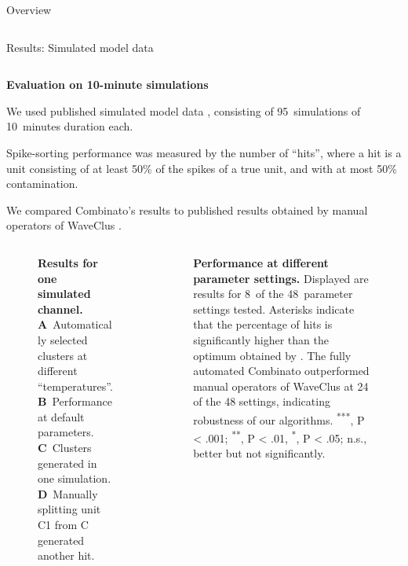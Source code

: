 \documentclass{beamer}
\renewcommand{\emph}{\textbf}
\newenvironment{wideitemize}{\itemize\addtolength{\itemsep}{.2em}\addtolength{\labelsep}{.1ex}}{\enditemize}
\begin{document}
\begin{frame}[t]
\begin{columns}[T]
\begin{column}{.49\linewidth}
\begin{block}{Overview}
\begin{columns}[T]
\begin{column}{.57\linewidth}
\end{column}
\end{columns}
\end{block}


  \begin{block}{Results: Simulated model data}

\begin{columns}[T]
\begin{column}{.95\linewidth}
\emph{Evaluation on 10-minute simulations}
        \begin{wideitemize}
    \item We used published simulated model data \parencite{pedreira_how_2012}, consisting of 95~simulations of 10~minutes duration each.
    \item Spike-sorting performance was measured by the number of ``hits'', where a hit is a unit consisting of at least 50\% of the spikes of a true unit, and with at most 50\% contamination.
    \item We compared Combinato's results to published results \parencite{pedreira_how_2012} obtained by manual operators of WaveClus \parencite{quian_quiroga_unsupervised_2004}.
    \end{wideitemize}

  
\begin{columns}[T]
  \begin{column}{.47\linewidth}

    \begin{figure}
\label{fig:results_sim}
\begin{center}
\end{center}
\caption{\emph{Results for one simulated channel.} \textbf{A}~Automatically selected clusters at different ``temperatures''. \textbf{B}~Performance at default parameters. \textbf{C}~Clusters generated in one simulation. \textbf{D}~Manually splitting unit C1 from C generated another hit.}
\end{figure}
\end{column}
\begin{column}{.48\linewidth}


  \begin{figure}
\label{fig:results_sim}
\begin{center}
\end{center}
\caption{\emph{Performance at different parameter settings.} Displayed are results for 8~of the 48~parameter settings tested. Asterisks indicate that the percentage of hits is significantly higher than the optimum obtained by \cite{pedreira_how_2012}. The fully automated Combinato outperformed manual operators of WaveClus at 24 of the 48 settings, indicating robustness of our algorithms. \textsuperscript{***}, P < .001; \textsuperscript{**}, P < .01, \textsuperscript{*}, P < .05; n.s., better but not significantly.}
\end{figure}


\end{column}
\end{columns}
\end{column}
\end{columns}
\end{block}
\end{column}
\end{columns}
\end{frame}
\end{document}
